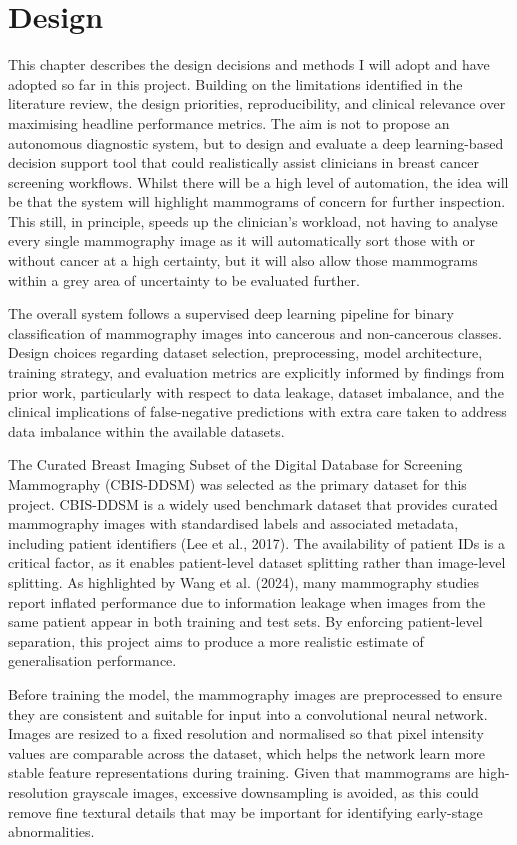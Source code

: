 \section{Design}

This chapter describes the design decisions and methods I will adopt and have adopted so far in this project. Building on the limitations identified in the literature review, the design priorities, reproducibility, and clinical relevance over maximising headline performance metrics. The aim is not to propose an autonomous diagnostic system, but to design and evaluate a deep learning-based decision support tool that could realistically assist clinicians in breast cancer screening workflows. Whilst there will be a high level of automation, the idea will be that the system will highlight mammograms of concern for further inspection. This still, in principle, speeds up the clinician’s workload, not having to analyse every single mammography image as it will automatically sort those with or without cancer at a high certainty, but it will also allow those mammograms within a grey area of uncertainty to be evaluated further.

The overall system follows a supervised deep learning pipeline for binary classification of mammography images into cancerous and non-cancerous classes. Design choices regarding dataset selection, preprocessing, model architecture, training strategy, and evaluation metrics are explicitly informed by findings from prior work, particularly with respect to data leakage, dataset imbalance, and the clinical implications of false-negative predictions with extra care taken to address data imbalance within the available datasets.

The Curated Breast Imaging Subset of the Digital Database for Screening Mammography (CBIS-DDSM) was selected as the primary dataset for this project. CBIS-DDSM is a widely used benchmark dataset that provides curated mammography images with standardised labels and associated metadata, including patient identifiers (Lee et al., 2017). The availability of patient IDs is a critical factor, as it enables patient-level dataset splitting rather than image-level splitting. As highlighted by Wang et al. (2024), many mammography studies report inflated performance due to information leakage when images from the same patient appear in both training and test sets. By enforcing patient-level separation, this project aims to produce a more realistic estimate of generalisation performance.

Before training the model, the mammography images are preprocessed to ensure they are consistent and suitable for input into a convolutional neural network. Images are resized to a fixed resolution and normalised so that pixel intensity values are comparable across the dataset, which helps the network learn more stable feature representations during training. Given that mammograms are high-resolution grayscale images, excessive downsampling is avoided, as this could remove fine textural details that may be important for identifying early-stage abnormalities.

